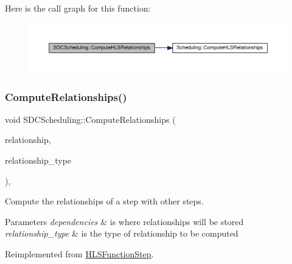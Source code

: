 Here is the call graph for this function\+:
\nopagebreak
\begin{figure}[H]
\begin{center}
\leavevmode
\includegraphics[width=350pt]{d4/dc5/classSDCScheduling_aec06b6a8117baa3496c1ee294c4341ab_cgraph}
\end{center}
\end{figure}
\mbox{\label{classSDCScheduling_a28390f2bb68bc997c4827f5dbd240ca5}} 
\subsubsection{\texorpdfstring{Compute\+Relationships()}{ComputeRelationships()}}
{\footnotesize\ttfamily void S\+D\+C\+Scheduling\+::\+Compute\+Relationships (\begin{DoxyParamCaption}\item[{\hyperlink{classDesignFlowStepSet}{Design\+Flow\+Step\+Set} \&}]{relationship,  }\item[{const \hyperlink{classDesignFlowStep_a723a3baf19ff2ceb77bc13e099d0b1b7}{Design\+Flow\+Step\+::\+Relationship\+Type}}]{relationship\+\_\+type }\end{DoxyParamCaption})\hspace{0.3cm}{\ttfamily [override]}, {\ttfamily [virtual]}}



Compute the relationships of a step with other steps. 


\begin{DoxyParams}{Parameters}
{\em dependencies} & is where relationships will be stored \\
\hline
{\em relationship\+\_\+type} & is the type of relationship to be computed \\
\hline
\end{DoxyParams}


Reimplemented from \hyperlink{classHLSFunctionStep_ab3864e8dbd73b0eabc25f386a0cece54}{H\+L\+S\+Function\+Step}.



